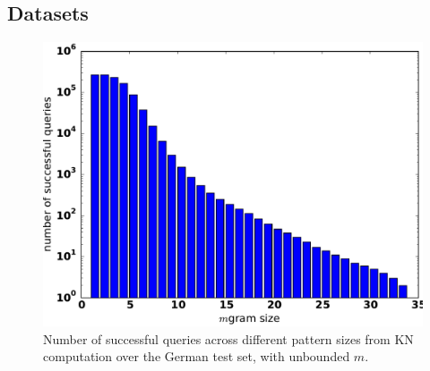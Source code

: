 
\subsection{Datasets}
\begin{table}
\caption{Data statistics after tokenizing, sentence-splitting, and removing markups, and numberizing. Tokens and sentence counts refer to the training partition. }
\end{table}

\begin{figure}
\includegraphics[width=\columnwidth]{figures/german_pattern_size.pdf}
\caption{Number of successful queries across different pattern sizes from KN computation over the German test set, with unbounded $m$.}
\end{figure}

